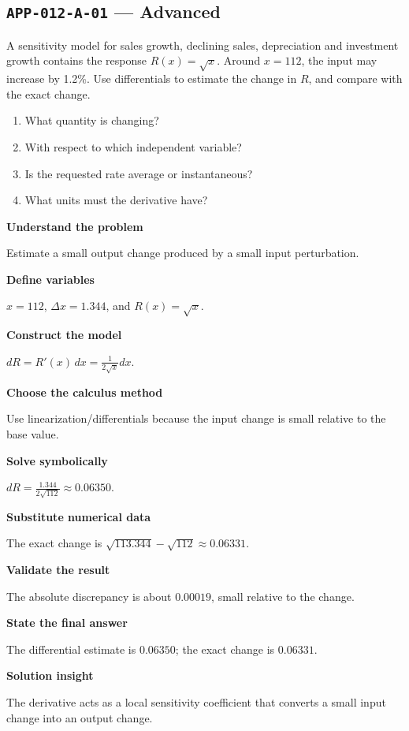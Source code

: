 \documentclass[11pt]{book}
\newcommand{\pid}[1]{\texttt{#1}}
\begin{document}
\subsection*{\pid{APP-012-A-01} — Advanced}
\begin{problembox}
A sensitivity model for sales growth, declining sales, depreciation and investment growth contains the response $R(x)=\sqrt{x}$. Around $x=112$, the input may increase by 1.2\%. Use differentials to estimate the change in $R$, and compare with the exact change.
\end{problembox}
\begin{promptbox}\begin{enumerate}
\item What quantity is changing?
\item With respect to which independent variable?
\item Is the requested rate average or instantaneous?
\item What units must the derivative have?
\end{enumerate}\end{promptbox}
\begin{solutionbox}
\textbf{Understand the problem}\par Estimate a small output change produced by a small input perturbation.\par\medskip
\textbf{Define variables}\par $x=112$, $\Delta x=1.344$, and $R(x)=\sqrt x$.\par\medskip
\textbf{Construct the model}\par $dR=R'(x)\,dx=\frac{1}{2\sqrt{x}}dx$.\par\medskip
\textbf{Choose the calculus method}\par Use linearization/differentials because the input change is small relative to the base value.\par\medskip
\textbf{Solve symbolically}\par $dR=\frac{1.344}{2\sqrt{112}}\approx 0.06350$.\par\medskip
\textbf{Substitute numerical data}\par The exact change is $\sqrt{113.344}-\sqrt{112}\approx 0.06331$.\par\medskip
\textbf{Validate the result}\par The absolute discrepancy is about $0.00019$, small relative to the change.\par\medskip
\textbf{State the final answer}\par The differential estimate is $0.06350$; the exact change is $0.06331$.\par\medskip
\textbf{Solution insight}\par The derivative acts as a local sensitivity coefficient that converts a small input change into an output change.\par\medskip
\end{solutionbox}
\end{document}

